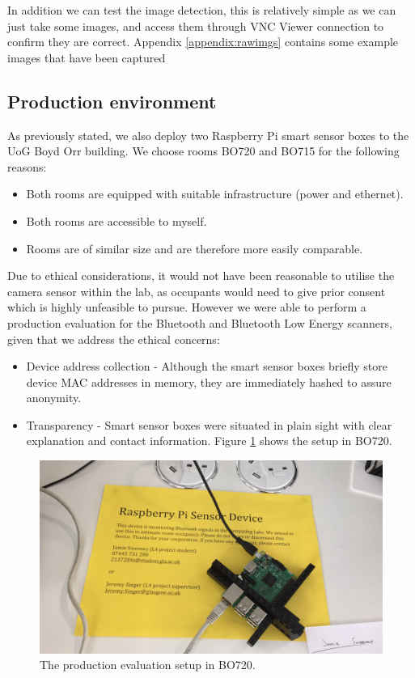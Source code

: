 \documentclass{l4proj}
\begin{document}
In addition we can test the image detection, this is relatively simple as we can just take some images, and access them through VNC Viewer connection to confirm they are correct. Appendix \ref{appendix:rawimgs} contains some example images that have been captured

\subsection{Production environment}

As previously stated, we also deploy two Raspberry Pi smart sensor boxes to the UoG Boyd Orr building. We choose rooms BO720 and BO715 for the following reasons:

\begin{itemize}	
  \item Both rooms are equipped with suitable infrastructure (power and ethernet).
  \item Both rooms are accessible to myself.
  \item Rooms are of similar size and are therefore more easily comparable.
\end{itemize}

Due to ethical considerations, it would not have been reasonable to utilise the camera sensor within the lab, as occupants would need to give prior consent which is highly unfeasible to pursue. However we were able to perform a production evaluation for the Bluetooth and Bluetooth Low Energy scanners, given that we address the ethical concerns:
\begin{itemize}	
  \item Device address collection - Although the smart sensor boxes briefly store device MAC addresses in memory, they are immediately hashed to assure anonymity.
  \item Transparency - Smart sensor boxes were situated in plain sight with clear explanation and contact information. Figure \ref{fig:testrpi} shows the setup in BO720.
\end{itemize}
\begin{figure}
\centering
\includegraphics[width=\textwidth]{testrpi}
\caption{The production evaluation setup in BO720.}
\label{fig:testrpi}
\end{figure}
\end{document}

